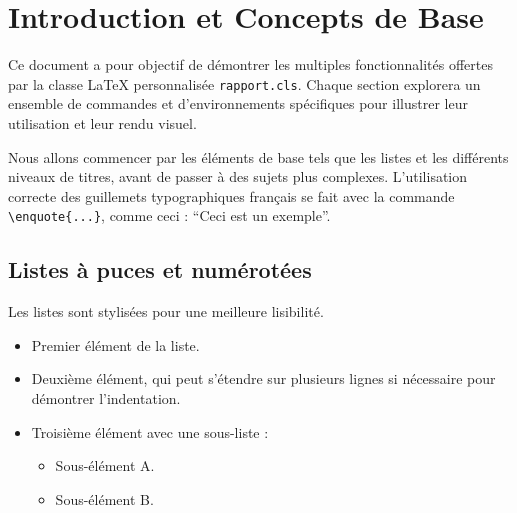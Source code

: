 \documentclass{mytex}
\begin{document}
	
	\fairepagedegarde
	
	\fairemarges
	
	\tabledematieres
	
	
	\section{Introduction et Concepts de Base}
	
	Ce document a pour objectif de démontrer les multiples fonctionnalités offertes par la classe \LaTeX{} personnalisée \texttt{rapport.cls}. Chaque section explorera un ensemble de commandes et d'environnements spécifiques pour illustrer leur utilisation et leur rendu visuel.
	
	
	Nous allons commencer par les éléments de base tels que les listes et les différents niveaux de titres, avant de passer à des sujets plus complexes. L'utilisation correcte des guillemets typographiques français se fait avec la commande \verb|\enquote{...}|, comme ceci : \enquote{Ceci est un exemple}.
	
	\subsection{Listes à puces et numérotées}
	
	Les listes sont stylisées pour une meilleure lisibilité.
	
	\begin{itemize}
		\item Premier élément de la liste.
		\item Deuxième élément, qui peut s'étendre sur plusieurs lignes si nécessaire pour démontrer l'indentation.
		\item Troisième élément avec une sous-liste :
		\begin{itemize}
			\item Sous-élément A.
			\item Sous-élément B.
		\end{itemize}
	\end{itemize}
	
\end{document}
